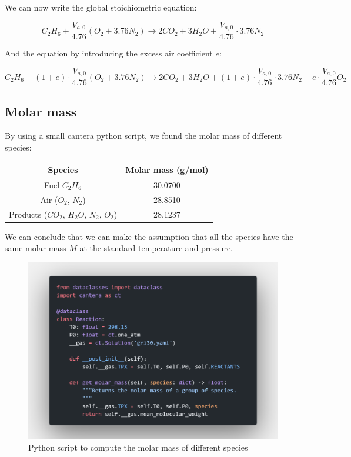 \documentclass[11pt, a4paper]{article} %
\begin{document}
We can now write the global stoichiometric equation:

\begin{equation}
    \boxed{
        C_2H_6 + \frac{V_{a,0}}{4.76} \left( O_2 + 3.76 N_2 \right) \rightarrow 2 CO_2 + 3 H_2O + \frac{V_{a,0}}{4.76} \cdot 3.76 N_2
    }
\end{equation}

And the equation by introducing the excess air coefficient $e$:

\begin{equation}
    \boxed{
        C_2H_6 + \left( 1+e \right) \cdot \frac{V_{a,0}}{4.76} \left( O_2 + 3.76 N_2 \right) \rightarrow 2 CO_2 + 3 H_2O + \left( 1+e \right) \cdot \frac{V_{a,0}}{4.76} \cdot 3.76 N_2 + e \cdot \frac{V_{a,0}}{4.76} O_2
    }
\end{equation}


\subsection{Molar mass}

By using a small cantera python script, we found the molar mass of different species:

\begin{center}
    \begin{tabular}{|c|c|}
        \hline
        Species & Molar mass (g/mol) \\
        \hline
        Fuel $C_2H_6$ & 30.0700 \\
        \hline
        Air ($O_2$, $N_2$) & 28.8510 \\
        \hline
        Products ($CO_2$, $H_2O$, $N_2$, $O_2$) & 28.1237 \\
        \hline
    \end{tabular}
\end{center}

We can conclude that we can make the assumption that all the species have the same molar mass $M$ at the standard temperature and pressure.

\begin{figure}[H]
    \centering
    \includegraphics[width=0.6\linewidth]{images/mean_molecular_weight.png}
    \caption{Python script to compute the molar mass of different species}
    \label{fig:ethane_air_molar_mass}
\end{figure}
\end{document}
